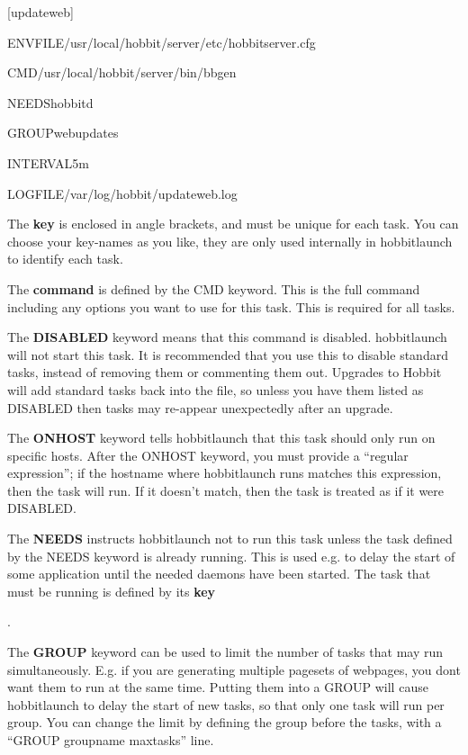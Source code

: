   
[updateweb]  
 
ENVFILE/usr/local/hobbit/server/etc/hobbitserver.cfg  
 
CMD/usr/local/hobbit/server/bin/bbgen  
 
NEEDShobbitd  
 
GROUPwebupdates  
 
INTERVAL5m  
 
LOGFILE/var/log/hobbit/updateweb.log 


  The \textbf{key} is enclosed in angle brackets, and must be unique
  for each task. You can choose your key-names as you like, they are
  only used internally in hobbitlaunch to identify each task. 



  The \textbf{command}
 is defined by the CMD keyword. This is the full command including any
 options you want to use for this task. This is required for all
 tasks. 



  The \textbf{DISABLED}
 keyword means that this command is disabled. hobbitlaunch will not
 start this task. It is recommended that you use this to disable
 standard tasks, instead of removing them or commenting them
 out. Upgrades to Hobbit will add standard tasks back into the file,
 so unless you have them listed as DISABLED then tasks may re-appear
 unexpectedly after an upgrade. 



  The \textbf{ONHOST}
 keyword tells hobbitlaunch that this task should only run on specific
 hosts. After the ONHOST keyword, you must provide a ``regular
 expression''; if the hostname where hobbitlaunch runs matches this
 expression, then the task will run. If it doesn't match, then the
 task is treated as if it were DISABLED. 



  The \textbf{NEEDS}
 instructs hobbitlaunch not to run this task unless the task defined
 by the NEEDS keyword is already running. This is used e.g. to delay
 the start of some application until the needed daemons have been
 started. The task that must be running is defined by its \textbf{key}

. 


  The \textbf{GROUP}
 keyword can be used to limit the number of tasks that may run
 simultaneously. E.g. if you are generating multiple pagesets of
 webpages, you dont want them to run at the same time. Putting them
 into a GROUP will cause hobbitlaunch to delay the start of new tasks,
 so that only one task will run per group. You can change the limit by
 defining the group before the tasks, with a ``GROUP groupname
 maxtasks'' line. 



